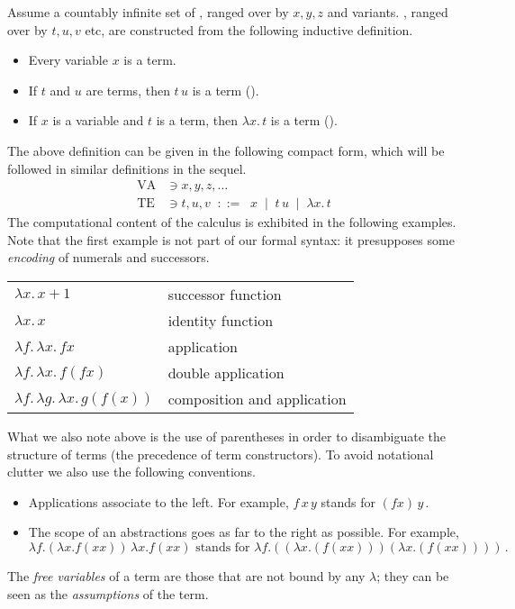 \documentclass{svmult}
\begin{document}
\begin{mydefinition}
Assume a countably infinite set of , ranged over by $x,y,z$ and variants.
, ranged over by $t,u,v$ etc, are constructed from the following inductive definition.
\begin{itemize}
  \item Every variable $x$ is a term.
  \item If $t$ and $u$ are terms, then $t\,u$ is a term ().
  \item If $x$ is a variable and $t$ is a term, then $\lambda x.\,t$ is a term (). \deq
\end{itemize}
\end{mydefinition}
The above definition can be given in the following compact form, which will be followed in similar definitions in the sequel.
\begin{align*}
    \mathrm{VA} &\ni x,y,z,\dots \\
    \mathrm{TE} &\ni t,u,v \;\; ::= \;\; x \; \mid \; {t\,u} \; \mid \; {\lambda x . \, t}
\end{align*}
%
The computational content of the calculus is exhibited in the following examples.
Note that the first example is not part of our formal syntax: it presupposes some \emph{encoding} of numerals and successors.
\begin{center}
\begin{tabular}{l@{\quad}l}
$\lambda x. \, x+1$ & successor function \\
$\lambda x . \, x$ & identity function \\
$ \lambda f . \, \lambda x. \, fx$ & application \\
$\lambda f. \, \lambda x. \, f(fx)$ & double application \\
$\lambda f. \, \lambda g. \, \lambda x. \, g(f(x))$ & composition and application
\end{tabular}
\end{center}
What we also note above is the use of parentheses in order to disambiguate the structure of terms (\ie the precedence of term constructors). To avoid notational clutter we also use the following conventions.
\begin{itemize}
  \item Applications associate to the left. For example, $f\,x\,y$ stands for $(fx)\,y$\,.
  \item The scope of an abstractions goes as far to the right as possible. For example,
  \[ \lambda f.(\lambda x.f(xx))\,\lambda x.f(xx)\text{ \ stands for \ }\lambda f.((\lambda x.(f(xx)))(\lambda x.(f(xx))))\,. \]
\end{itemize}
The \emph{free variables} of a term are those that are not bound by any $\lambda$; they can be seen as the \emph{assumptions} of the term.
\end{document}
